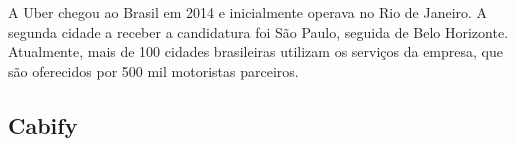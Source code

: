 A Uber chegou ao Brasil em 2014 e inicialmente operava no Rio de Janeiro. A segunda cidade a receber a candidatura foi São Paulo, seguida de Belo Horizonte. Atualmente, mais de 100 cidades brasileiras utilizam os serviços da empresa, que são oferecidos por 500 mil motoristas parceiros.

\subsection{Cabify}

